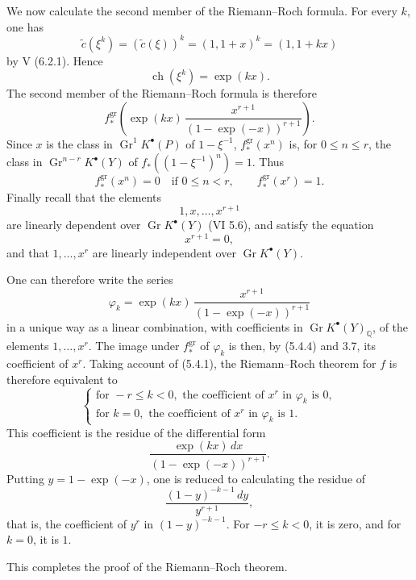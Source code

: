 \documentclass[11pt]{article}
\newcommand{\Gr}{\operatorname{Gr}}
\newcommand{\ch}{\operatorname{ch}}
\providecommand{\ch}{\operatorname{ch}}
\providecommand{\Gr}{\operatorname{Gr}}
\providecommand{\Gr}{\operatorname{G}}
\begin{document}
We now calculate the second member of the Riemann--Roch formula. For every \(k\), one has
\[
 \widetilde c(\xi^k)=(\widetilde c(\xi))^k=(1,1+x)^k=(1,1+kx)
\]
by V (6.2.1). Hence
\begin{equation}\tag{5.4.2}
 \ch(\xi^k)=\exp(kx).
\end{equation}
The second member of the Riemann--Roch formula is therefore
\begin{equation}\tag{5.4.3}
 f^{\mathrm{gr}}_*\left(\exp(kx)\,
 \frac{x^{r+1}}{(1-\exp(-x))^{r+1}}\right).
\end{equation}
Since \(x\) is the class in \(\Gr^1K^{\bullet}(P)\) of \(1-\xi^{-1}\), \(f^{\mathrm{gr}}_*(x^n)\) is, for \(0\leq n\leq r\), the class in
\(\Gr^{n-r}K^{\bullet}(Y)\) of \(f_*((1-\xi^{-1})^n)=1\). Thus
\begin{equation}\tag{5.4.4}
 f^{\mathrm{gr}}_*(x^n)=0\quad\text{if }0\leq n<r,\qquad
 f^{\mathrm{gr}}_*(x^r)=1.
\end{equation}
Finally recall that the elements
\[
1,x,\ldots,x^{r+1}
\]
are linearly dependent over \(\Gr K^{\bullet}(Y)\) (VI 5.6), and satisfy the equation
\begin{equation}\tag{5.4.5}
 x^{r+1}=0,
\end{equation}
and that \(1,\ldots,x^r\) are linearly independent over \(\Gr K^{\bullet}(Y)\).

One can therefore write the series
\[
\varphi_k=\exp(kx)\,
\frac{x^{r+1}}{(1-\exp(-x))^{r+1}}
\]
in a unique way as a linear combination, with coefficients in
\(\Gr K^{\bullet}(Y)_{\mathbb Q}\), of the elements \(1,\ldots,x^r\). The image under \(f^{\mathrm{gr}}_*\) of \(\varphi_k\) is then, by (5.4.4) and 3.7, its coefficient of \(x^r\). Taking account of (5.4.1), the Riemann--Roch theorem for \(f\) is therefore equivalent to
\[
\left\{
\begin{array}{ll}
\text{for }-r\leq k<0,\text{ the coefficient of }x^r\text{ in }\varphi_k\text{ is }0,\\
\text{for }k=0,\text{ the coefficient of }x^r\text{ in }\varphi_k\text{ is }1.
\end{array}
\right.
\tag{RR}
\]
This coefficient is the residue of the differential form
\[
 \frac{\exp(kx)\,dx}{(1-\exp(-x))^{r+1}}.
\]
Putting \(y=1-\exp(-x)\), one is reduced to calculating the residue of
\[
 \frac{(1-y)^{-k-1}\,dy}{y^{r+1}},
\]
that is, the coefficient of \(y^r\) in \((1-y)^{-k-1}\). For \(-r\leq k<0\), it is zero, and for \(k=0\), it is \(1\).

This completes the proof of the Riemann--Roch theorem.
\end{document}
